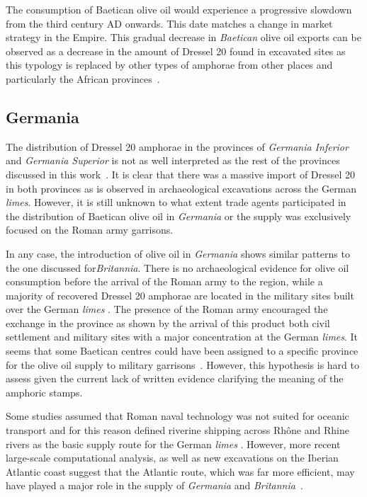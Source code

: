 The consumption of Baetican olive oil would experience a progressive slowdown from the third century AD onwards. This date matches a change in market strategy in the Empire. This gradual decrease in \textit{Baetican} olive oil exports can be observed as a decrease in the amount of Dressel 20 found in excavated sites as this typology is replaced by other types of amphorae from other places and particularly the African provinces~\citep{rodriguez1991aceite,millet_anforas_1998}.

\subsection{Germania}
\label{sec:4}

The distribution of Dressel 20 amphorae in the provinces of \textit{Germania Inferior} and \textit{Germania Superior} is not as well interpreted as the rest of the provinces discussed in this work~\citep[293]{remesal_baetica_2002}. 
It is clear that there was a massive import of Dressel 20 in both provinces as is observed in archaeological excavations across the German \textit{limes}. However, it is still unknown to what extent trade agents participated in the distribution of Baetican olive oil in \textit{Germania} or the supply was exclusively focused on the Roman army garrisons\citep[156]{remesal_germn_2010}.

In any case, the introduction of olive oil in \textit{Germania} shows similar patterns to the one discussed for\textit{Britannia}. There is no archaeological evidence for olive oil consumption before the arrival of the Roman army to the region, while a majority of recovered Dressel 20 amphorae are located in the military sites built over the German \textit{limes} \citep{remesal_germaniaengl_2002}. The presence of the Roman army encouraged the exchange in the province as shown by the arrival of this product both civil settlement and military sites with a major concentration at the German \textit{limes}. It seems that some Baetican centres could have been assigned to a specific province for the olive oil supply to military garrisons~\citep[125]{remesal_concierto}. However, this hypothesis is hard to assess given the current lack of written evidence clarifying the meaning of the amphoric stamps. 

Some studies assumed that Roman naval technology was not suited for oceanic transport and for this reason defined riverine shipping across Rh\^one and Rhine rivers as the basic supply route for the German \textit{limes} \citep{marliere2001tonneau}. However, more recent large-scale computational analysis, as well as new excavations on the Iberian Atlantic coast suggest that the Atlantic route, which was far more efficient, may have played a major role in the supply of \textit{Germania} and \textit{Britannia}~\citep{rubio-campillo_ecology_2018}.



